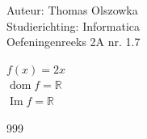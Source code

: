 \documentclass[a4paper]{article}
\begin{document}
\noindent \large Auteur: Thomas Olszowka \\
\noindent \large Studierichting: Informatica\\
\noindent \large Oefeningenreeks 2A nr. 1.7\\

\medskip

\normalsize

$f(x) = 2x$ \\

$\operatorname{dom}f = \mathbb{R}$ \\

$\operatorname{Im}f = \mathbb{R}$ \\

\begin{thebibliography}{999}
\end{thebibliography}
\end{document}
